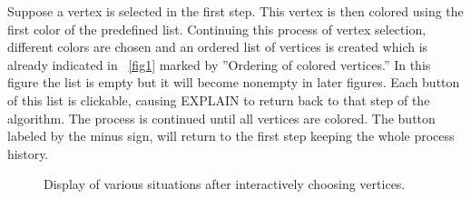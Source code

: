 \documentclass[12pt, oneside]{book}
\begin{document}
Suppose a vertex is selected in the first step. This vertex is then colored using the first color of the predefined list. Continuing this process of vertex selection, different colors are chosen and an ordered list of vertices is created which is already indicated in \figurename~\ref{fig1} marked by ''Ordering of colored vertices.'' In this figure the list is empty but it will become nonempty in later figures. Each button of this list is clickable, causing \mbox{EXPLAIN} to return back to that step of the algorithm. The process is continued until all vertices are colored. The button labeled by the minus sign, will return to the first step keeping the whole process history.


\begin{figure}
\centering
{}
\centering
{}
\centering
{}
\centering
{}
\caption{Display of various situations after interactively choosing vertices.}
\label{algorihtm}
\end{figure}
\end{document}
